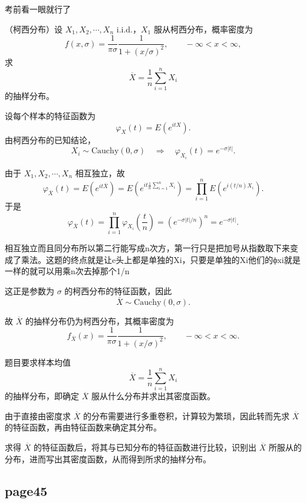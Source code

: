 \begin{dxtips}
    考前看一眼就行了
\end{dxtips}
\begin{homework}[6]
（柯西分布）设 $X_1,X_2,\cdots,X_n$ i.i.d.，$X_1$ 服从柯西分布，概率密度为
\[
f(x,\sigma)=\frac{1}{\pi\sigma}\frac{1}{1+(x/\sigma)^2},\qquad -\infty<x<\infty,
\]
求
\[
\overline{X}=\frac{1}{n}\sum_{i=1}^n X_i
\]
的抽样分布。
\end{homework}
\begin{solution}
设每个样本的特征函数为
\[
\varphi_X(t)=E(e^{itX}).
\]
由柯西分布的已知结论，
\[
X_i\sim \mathrm{Cauchy}(0,\sigma)
\quad\Longrightarrow\quad
\varphi_{X_i}(t)=e^{-\sigma|t|}.
\]

由于 $X_1,X_2,\cdots,X_n$ 相互独立，故
\[
\varphi_{\overline X}(t)
=
E\!\left(e^{it\overline X}\right)
=
E\!\left(e^{it\frac{1}{n}\sum_{i=1}^n X_i}\right)
=
\prod_{i=1}^n E\!\left(e^{i(t/n)X_i}\right).
\]
于是
\[
\varphi_{\overline X}(t)
=
\prod_{i=1}^n \varphi_{X_i}\!\left(\frac tn\right)
=
\left(e^{-\sigma|t|/n}\right)^n
=
e^{-\sigma|t|}.
\]
\begin{dxtips}
相互独立而且同分布所以第二行能写成n次方，第一行只是把加号从指数取下来变成了乘法。这题的终点就是让e头上都是单独的Xi，只要是单独的Xi他们的ϕxi就是一样的就可以用乘n次去掉那个1/n
\end{dxtips}
这正是参数为 $\sigma$ 的柯西分布的特征函数，因此
\[
\overline X \sim \mathrm{Cauchy}(0,\sigma).
\]

故 $\overline X$ 的抽样分布仍为柯西分布，其概率密度为
\[
f_{\overline X}(x)
=
\frac{1}{\pi\sigma}\frac{1}{1+(x/\sigma)^2},
\qquad -\infty<x<\infty.
\]
\end{solution}
\begin{dxtips}
    题目要求样本均值
\[
\overline{X}=\frac{1}{n}\sum_{i=1}^{n}X_i
\]
的抽样分布，即确定 \(\overline{X}\) 服从什么分布并求出其密度函数。

由于直接由密度求 \(\overline{X}\) 的分布需要进行多重卷积，计算较为繁琐，因此转而先求 \(\overline{X}\) 的特征函数，再由特征函数来确定其分布。

求得 \(\overline{X}\) 的特征函数后，将其与已知分布的特征函数进行比较，识别出 \(\overline{X}\) 所服从的分布，进而写出其密度函数，从而得到所求的抽样分布。
\end{dxtips}
\subsection*{page45}

